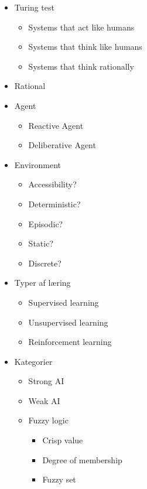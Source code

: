 \documentclass[a4paper,11pt]{article}
\begin{document}
\begin{itemize}
    \item Turing test
        \begin{itemize}
            \item Systems that act like humans
            \item Systems that think like humans
            \item Systems that think rationally
        \end{itemize}
    \item Rational
    \item Agent
        \begin{itemize}
            \item Reactive Agent
            \item Deliberative Agent
        \end{itemize}
    \item Environment 
        \begin{itemize}
            \item Accessibility?
            \item Deterministic?
            \item Episodic?
            \item Static?
            \item Discrete?
        \end{itemize}
            \item Typer af læring
        \begin{itemize}
            \item Supervised learning
            \item Unsupervised learning
            \item Reinforcement learning
        \end{itemize}
    \item Kategorier
        \begin{itemize}
            \item Strong AI
            \item Weak AI
        \end{itemize}
        \begin{itemize}
            \item Fuzzy logic
                \begin{itemize}
                    \item Crisp value
                    \item Degree of membership
                    \item Fuzzy set

\end{itemize}
\end{itemize}
\end{itemize}
\end{document}

